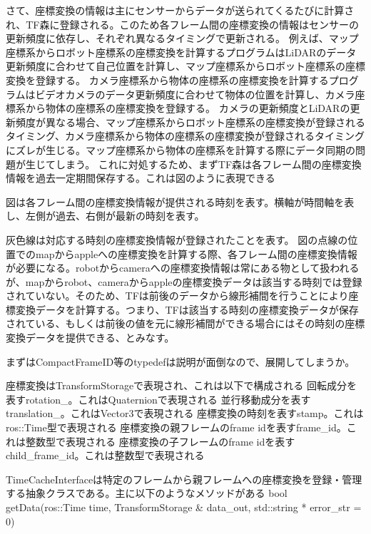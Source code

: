 \documentclass{jarticle}
\begin{document}
\begin{multicols}{2}
さて、座標変換の情報は主にセンサーからデータが送られてくるたびに計算され、TF森に登録される。このため各フレーム間の座標変換の情報はセンサーの更新頻度に依存し、それぞれ異なるタイミングで更新される。
例えば、マップ座標系からロボット座標系の座標変換を計算するプログラムはLiDARのデータ更新頻度に合わせて自己位置を計算し、マップ座標系からロボット座標系の座標変換を登録する。
カメラ座標系から物体の座標系の座標変換を計算するプログラムはビデオカメラのデータ更新頻度に合わせて物体の位置を計算し、カメラ座標系から物体の座標系の座標変換を登録する。
カメラの更新頻度とLiDARの更新頻度が異なる場合、マップ座標系からロボット座標系の座標変換が登録されるタイミング、カメラ座標系から物体の座標系の座標変換が登録されるタイミングにズレが生じる。マップ座標系から物体の座標系を計算する際にデータ同期の問題が生じてしまう。
これに対処するため、まずTF森は各フレーム間の座標変換情報を過去一定期間保存する。これは図のように表現できる


図は各フレーム間の座標変換情報が提供される時刻を表す。横軸が時間軸を表し、左側が過去、右側が最新の時刻を表す。

灰色線は対応する時刻の座標変換情報が登録されたことを表す。
図の点線の位置でのmapからappleへの座標変換を計算する際、各フレーム間の座標変換情報が必要になる。robotからcameraへの座標変換情報は常にある物として扱われるが、mapからrobot、cameraからappleの座標変換データは該当する時刻では登録されていない。そのため、TFは前後のデータから線形補間を行うことにより座標変換データを計算する。つまり、TFは該当する時刻の座標変換データが保存されている、もしくは前後の値を元に線形補間ができる場合にはその時刻の座標変換データを提供できる、とみなす。





まずはCompactFrameID等のtypedefは説明が面倒なので、展開してしまうか。


座標変換はTransformStorageで表現され、これは以下で構成される
回転成分を表すrotation\_。これはQuaternionで表現される
並行移動成分を表すtranslation\_。これはVector3で表現される
座標変換の時刻を表すstamp。これはros::Time型で表現される
座標変換の親フレームのframe idを表すframe\_id。これは整数型で表現される
座標変換の子フレームのframe idを表すchild\_frame\_id。これは整数型で表現される

TimeCacheInterfaceは特定のフレームから親フレームへの座標変換を登録・管理する抽象クラスである。主に以下のようなメソッドがある
bool getData(ros::Time time, TransformStorage \& data\_out, std::string * error\_str = 0)


\end{multicols}
\end{document}
